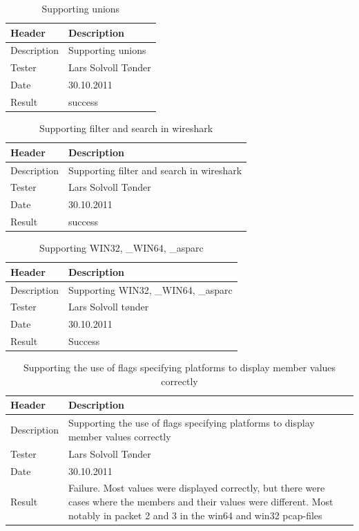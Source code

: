 \begin{table}[!htb] \footnotesize \center
\caption{Supporting unions\label{tab:sp3TID17}}
\begin{tabular}{l l}
	\toprule
	Header & Description \\
	\midrule
	Description & Supporting unions\\
	Tester & Lars Solvoll Tønder\\
	Date & 30.10.2011\\
	Result & success\\
	\bottomrule
\end{tabular}
\end{table}

\begin{table}[!htb] \footnotesize \center
\caption{Supporting filter and search in wireshark\label{tab:sp3TID18}}
\begin{tabular}{l l}
	\toprule
	Header & Description \\
	\midrule
	Description & Supporting filter and search in wireshark\\
	Tester & Lars Solvoll Tønder \\
	Date & 30.10.2011\\
	Result & success\\
	\bottomrule
\end{tabular}
\end{table}

\begin{table}[!htb] \footnotesize \center
\caption{Supporting WIN32, \_WIN64, \_\gls{asparc} \label{tab:sp3TID19}}
\begin{tabular}{l l}
	\toprule
	Header & Description \\
	\midrule
	Description & Supporting WIN32, \_WIN64, \_\gls{asparc} \\
	Tester & Lars Solvoll tønder\\
	Date & 30.10.2011\\
	Result & Success \\
	\bottomrule
\end{tabular}
\end{table}

\begin{table}[!htb] \footnotesize \center
\caption{Supporting the use of flags specifying platforms to display member values correctly \label{tab:sp3TID20}}
\begin{tabular}{l l}
	\toprule
	Header & Description \\
	\midrule
	Description & Supporting the use of flags specifying platforms to display member values correctly \\
	Tester & Lars Solvoll Tønder\\
	Date & 30.10.2011\\
	Result & Failure. Most values were displayed correctly, but there were cases where the members and their values were different. Most notably in \gls{packet} 2 and 3 in the win64 and win32 \glspl{pcap-file}\\
	\bottomrule
\end{tabular}
\end{table}

